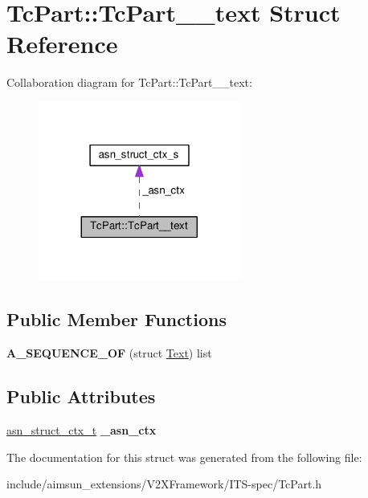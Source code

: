\hypertarget{structTcPart_1_1TcPart____text}{}\section{Tc\+Part\+:\+:Tc\+Part\+\_\+\+\_\+text Struct Reference}
\label{structTcPart_1_1TcPart____text}


Collaboration diagram for Tc\+Part\+:\+:Tc\+Part\+\_\+\+\_\+text\+:\nopagebreak
\begin{figure}[H]
\begin{center}
\leavevmode
\includegraphics[width=188pt]{structTcPart_1_1TcPart____text__coll__graph}
\end{center}
\end{figure}
\subsection*{Public Member Functions}
\begin{DoxyCompactItemize}
\item 
{\bfseries A\+\_\+\+S\+E\+Q\+U\+E\+N\+C\+E\+\_\+\+OF} (struct \hyperlink{structText}{Text}) list\hypertarget{structTcPart_1_1TcPart____text_a47d4652b982e0d244614215b8d40020d}{}\label{structTcPart_1_1TcPart____text_a47d4652b982e0d244614215b8d40020d}

\end{DoxyCompactItemize}
\subsection*{Public Attributes}
\begin{DoxyCompactItemize}
\item 
\hyperlink{structasn__struct__ctx__s}{asn\+\_\+struct\+\_\+ctx\+\_\+t} {\bfseries \+\_\+asn\+\_\+ctx}\hypertarget{structTcPart_1_1TcPart____text_aa2310f761cb0b5f1403707a0ea275caa}{}\label{structTcPart_1_1TcPart____text_aa2310f761cb0b5f1403707a0ea275caa}

\end{DoxyCompactItemize}


The documentation for this struct was generated from the following file\+:\begin{DoxyCompactItemize}
\item 
include/aimsun\+\_\+extensions/\+V2\+X\+Framework/\+I\+T\+S-\/spec/Tc\+Part.\+h\end{DoxyCompactItemize}
